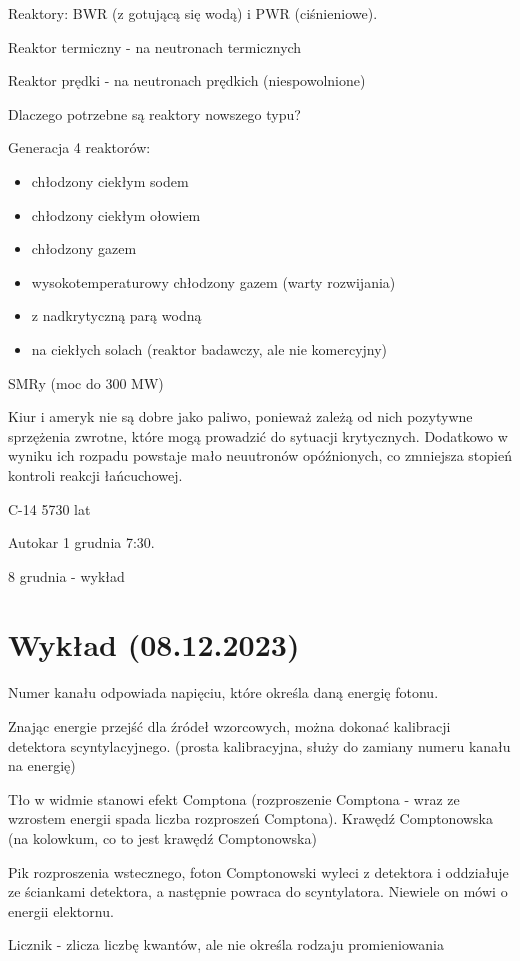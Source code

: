 \documentclass{article}
\begin{document}
Reaktory: BWR (z gotującą się wodą) i PWR (ciśnieniowe).

Reaktor termiczny - na neutronach termicznych

Reaktor prędki - na neutronach prędkich (niespowolnione)

Dlaczego potrzebne są reaktory nowszego typu?

Generacja 4 reaktorów:
\begin{itemize}
    \item chłodzony ciekłym sodem
    \item chłodzony ciekłym ołowiem
    \item chłodzony gazem
    \item wysokotemperaturowy chłodzony gazem (warty rozwijania)
    \item z nadkrytyczną parą wodną
    \item na ciekłych solach (reaktor badawczy, ale nie komercyjny)
\end{itemize}

SMRy (moc do 300 MW)

Kiur i ameryk nie są dobre jako paliwo, ponieważ zależą od nich pozytywne sprzężenia zwrotne, które mogą prowadzić do sytuacji krytycznych. Dodatkowo w wyniku ich rozpadu powstaje mało neuutronów opóźnionych, co zmniejsza stopień kontroli reakcji łańcuchowej.

C-14 5730 lat

Autokar 1 grudnia 7:30.

8 grudnia - wykład

\section{Wykład (08.12.2023)}

Numer kanału odpowiada napięciu, które określa daną energię fotonu.

Znając energie przejść dla źródeł wzorcowych, można dokonać kalibracji detektora scyntylacyjnego. (prosta kalibracyjna, służy do zamiany numeru kanału na energię)

Tło w widmie stanowi efekt Comptona (rozproszenie Comptona - wraz ze wzrostem energii spada liczba rozproszeń Comptona). Krawędź Comptonowska (na kolowkum, co to jest krawędź Comptonowska)

Pik rozproszenia wstecznego, foton Comptonowski wyleci z detektora i oddziałuje ze ściankami detektora, a następnie powraca do scyntylatora. Niewiele on mówi o energii elektornu.

Licznik - zlicza liczbę kwantów, ale nie określa rodzaju promieniowania
\end{document}
